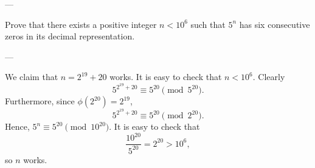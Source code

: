 
---

Prove that there exists a positive integer $n<10^6$ such that $5^n$ has six consecutive zeros in its decimal representation.

---

We claim that $n=2^{19}+20$ works. It is easy to check that $n<10^6$. Clearly \[5^{2^{19}+20}\equiv 5^{20}\pmod{5^{20}}.\]
Furthermore, since $\phi(2^{20})=2^{19}$, \[5^{2^{19}+20}\equiv 5^{20}\pmod{2^{20}}.\]
Hence, $5^n\equiv 5^{20}\pmod{10^{20}}$. It is easy to check that \[\frac{10^{20}}{5^{20}}=2^{20}>10^6,\]
so $n$ works.
